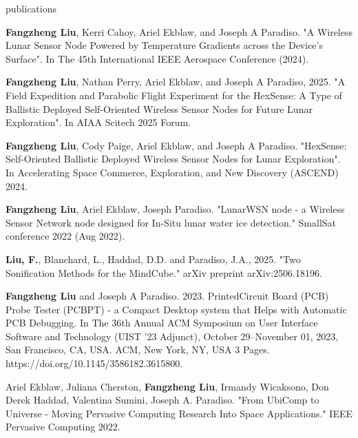 \documentclass{resume} %
\begin{document}
\begin{rSection}{publications}
\begin{itemlabel}
\item \textbf{Fangzheng Liu}, Kerri Cahoy, Ariel Ekblaw, and Joseph A Paradiso.
"A Wireless Lunar Sensor Node Powered by Temperature Gradients across the Device's Surface".
In The 45th International IEEE Aerospace Conference (2024).
\smallskip
\smallskip

\item \textbf{Fangzheng Liu}, Nathan Perry, Ariel Ekblaw, and Joseph A Paradiso, 2025.
"A Field Expedition and Parabolic Flight Experiment for the HexSense: A Type of Ballistic
Deployed Self-Oriented Wireless Sensor Nodes for Future Lunar Exploration".
In AIAA Scitech 2025 Forum.
\smallskip
\smallskip

\item \textbf{Fangzheng Liu},
Cody Paige, Ariel Ekblaw, and Joseph A Paradiso.
"HexSense: Self-Oriented Ballistic Deployed Wireless Sensor Nodes for Lunar Exploration".
In Accelerating Space Commerce, Exploration, and New Discovery (ASCEND) 2024.
\smallskip
\smallskip

\item \textbf{Fangzheng Liu}, Ariel Ekblaw, Joseph Paradiso.
"LunarWSN node - a Wireless Sensor Network node designed for In-Situ lunar water ice detection."
SmallSat conference 2022 (Aug 2022).
\smallskip
\smallskip

\item \textbf{Liu, F.}, Blanchard, L., Haddad, D.D. and Paradiso, J.A., 2025.
"Two Sonification Methods for the MindCube." arXiv preprint arXiv:2506.18196.
\smallskip
\smallskip

\item \textbf{Fangzheng Liu} and Joseph A Paradiso. 2023.
PrintedCircuit Board (PCB) Probe Tester (PCBPT) - a Compact Desktop system that Helps with Automatic PCB Debugging.
In The 36th Annual ACM Symposium on User Interface Software and Technology (UIST '23 Adjunct),
October 29--November 01, 2023, San Francisco, CA, USA. ACM, New York, NY, USA 3 Pages. https://doi.org/10.1145/3586182.3615800.
\smallskip
\smallskip

\item Ariel Ekblaw, Juliana Cherston, \textbf{Fangzheng Liu}, Irmandy Wicaksono, Don Derek Haddad, Valentina Sumini, Joseph A. Paradiso.
"From UbiComp to Universe - Moving Pervasive Computing Research Into Space Applications."
IEEE Pervasive Computing 2022.
\smallskip
\smallskip


\end{itemlabel}
\end{rSection}
\end{document}
